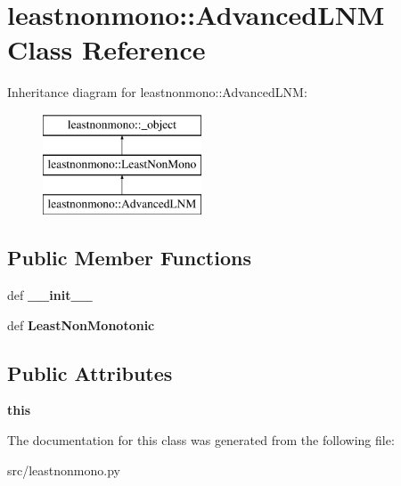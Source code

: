 \hypertarget{classleastnonmono_1_1AdvancedLNM}{
\section{leastnonmono::AdvancedLNM Class Reference}
\label{db/d0a/classleastnonmono_1_1AdvancedLNM}
}
Inheritance diagram for leastnonmono::AdvancedLNM:\begin{figure}[H]
\begin{center}
\leavevmode
\includegraphics[height=3cm]{db/d0a/classleastnonmono_1_1AdvancedLNM}
\end{center}
\end{figure}
\subsection*{Public Member Functions}
\begin{DoxyCompactItemize}
\item 
\hypertarget{classleastnonmono_1_1AdvancedLNM_adc8d6450940ccc985c1e0925059ec082}{
def {\bfseries \_\-\_\-init\_\-\_\-}}
\label{db/d0a/classleastnonmono_1_1AdvancedLNM_adc8d6450940ccc985c1e0925059ec082}

\item 
\hypertarget{classleastnonmono_1_1AdvancedLNM_a8a6bd15664826960139bd89731fe9fa2}{
def {\bfseries LeastNonMonotonic}}
\label{db/d0a/classleastnonmono_1_1AdvancedLNM_a8a6bd15664826960139bd89731fe9fa2}

\end{DoxyCompactItemize}
\subsection*{Public Attributes}
\begin{DoxyCompactItemize}
\item 
\hypertarget{classleastnonmono_1_1AdvancedLNM_a7487bd57076caf8236ddd3733f776fdb}{
{\bfseries this}}
\label{db/d0a/classleastnonmono_1_1AdvancedLNM_a7487bd57076caf8236ddd3733f776fdb}

\end{DoxyCompactItemize}


The documentation for this class was generated from the following file:\begin{DoxyCompactItemize}
\item 
src/leastnonmono.py\end{DoxyCompactItemize}
